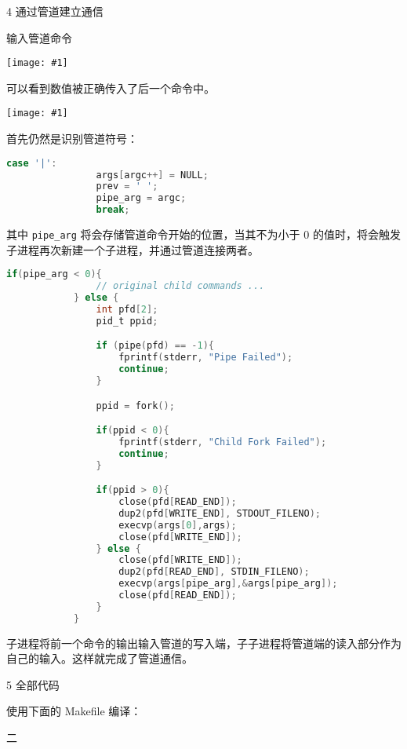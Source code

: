 \documentclass[12pt,a4paper]{article}
\newenvironment{problems}{\begin{list}{}{\renewcommand{\makelabel}[1]{\textbf{##1}\hfil}}}{\end{list}}
\newenvironment{steps}{\begin{list}{}{\renewcommand{\makelabel}[1]{##1.\hfil}}}{\end{list}}
\providecommand{\code}[2]{}
\providecommand{\img}[1]{\texttt{[image: \#1]}}
\begin{document}
\begin{problems}
\begin{steps}
        \item[4] 通过管道建立通信
        
        输入管道命令

        \img{less.png}

        可以看到数值被正确传入了后一个命令中。
        
        \img{pipe.png}

        首先仍然是识别管道符号：
        \begin{lstlisting}[language=c]
            case '|':
                args[argc++] = NULL;
                prev = ' ';
                pipe_arg = argc;
                break;
        \end{lstlisting}
        其中 \verb"pipe_arg" 将会存储管道命令开始的位置，当其不为小于 0 的值时，将会触发子进程再次新建一个子进程，并通过管道连接两者。
        \begin{lstlisting}[language=c]
            if(pipe_arg < 0){
                // original child commands ...
            } else {
                int pfd[2];
                pid_t ppid;

                if (pipe(pfd) == -1){
                    fprintf(stderr, "Pipe Failed");
                    continue;
                }

                ppid = fork();

                if(ppid < 0){
                    fprintf(stderr, "Child Fork Failed");
                    continue;
                }

                if(ppid > 0){
                    close(pfd[READ_END]);
                    dup2(pfd[WRITE_END], STDOUT_FILENO);
                    execvp(args[0],args);
                    close(pfd[WRITE_END]);
                } else {
                    close(pfd[WRITE_END]);
                    dup2(pfd[READ_END], STDIN_FILENO);
                    execvp(args[pipe_arg],&args[pipe_arg]);
                    close(pfd[READ_END]);
                }
            }
        \end{lstlisting}
        子进程将前一个命令的输出输入管道的写入端，子子进程将管道端的读入部分作为自己的输入。这样就完成了管道通信。

        
        
        \item[5] 全部代码
        
        使用下面的 Makefile 编译：
        \code{src/Makefile}{}
        
        \code{src/osh.c}{c}
        
    \end{steps} 
    \item[二]  

\end{problems}
\end{document}
